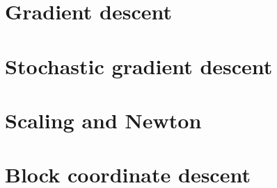 \documentclass[12pt, leqno]{article} %
\begin{document}

\section{Gradient descent}

\section{Stochastic gradient descent}

\section{Scaling and Newton}

\section{Block coordinate descent}
\end{document}
